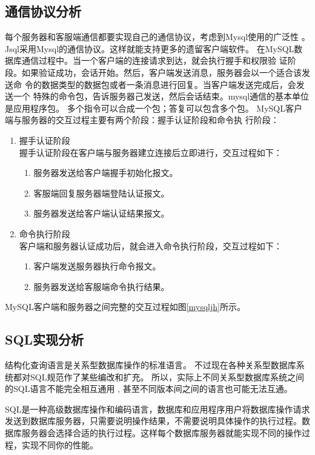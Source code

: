 \subsection{通信协议分析}
每个服务器和客服端通信都要实现自己的通信协议，考虑到Mysql使用的广泛性
。Jsql采用Mysql的通信协议。这样就能支持更多的遗留客户端软件。
在MySQL数据库通信过程中。当一个客户端的连接请求到达，就会执行握手和权限验
证阶段。如果验证成功，会话开始。然后，客户端发送消息，服务器会以一个适合该发送命
令的数据类型的数据包或者一条消息进行回复。当客户端发送完成后，会发送一个
特殊的命令包，告诉服务器己发送，然后会话结束。mysql通信的基本单位是应用程序包。
多个指令可以合成一个包；答复可以包含多个包。
MySQL客户端与服务器的交互过程主要有两个阶段：握手认证阶段和命令执
行阶段：
\begin{enumerate}
	\item 握手认证阶段\\
	握手认证阶段在客户端与服务器建立连接后立即进行，交互过程如下：
	\begin{enumerate}
		\item 服务器发送给客户端握手初始化报文。
		\item 客服端回复服务器端登陆认证报文。
		\item 服务器发送给客户端认证结果报文。
	\end{enumerate}
	\item 命令执行阶段\\
	客户端和服务器认证成功后，就会进入命令执行阶段，交互过程如下：
	\begin{enumerate}
		\item 	客户端发送服务器执行命令报文。
		\item 服务器发送给客服端命令执行结果。
	\end{enumerate}
\end{enumerate}
MySQL客户端和服务器之间完整的交互过程如图\ref{mysqljh}所示。
\subsection{SQL实现分析}
结构化查询语言是关系型数据库操作的标准语言。
不过现在各种关系型数据库系统都对SQL规范作了某些编改和扩充。
所以，实际上不同关系型数据库系统之间的SQL语言不能完全相互通用 ,
 甚至不同版本间之间的语言也可能无法互通。

SQL是一种高级数据库操作和编码语言，数据库和应用程序用户将数据库操作请求发送到数据库服务器，只需要说明操作结果，不需要说明具体操作的执行过程。数据库服务器会选择合适的执行过程。这样每个数据库服务器就能实现不同的操作过程，实现不同你的性能。

